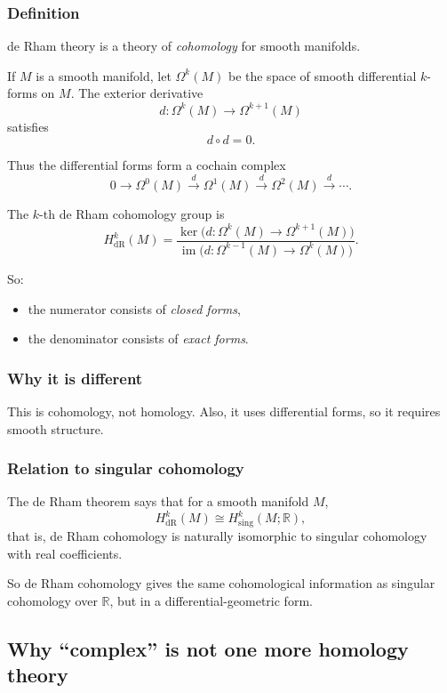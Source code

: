 \documentclass[12pt,a4paper]{article}
\theoremstyle{notespace}
\begin{document}
\subsubsection{Definition}

de Rham theory is a theory of \emph{cohomology} for smooth manifolds.

If \(M\) is a smooth manifold, let \(\Omega^k(M)\) be the space of smooth differential \(k\)-forms on \(M\). The exterior derivative
\[
d:\Omega^k(M)\to \Omega^{k+1}(M)
\]
satisfies
\[
d\circ d=0.
\]

Thus the differential forms form a cochain complex
\[
0\to \Omega^0(M)\xrightarrow{d}\Omega^1(M)\xrightarrow{d}\Omega^2(M)\xrightarrow{d}\cdots.
\]

The \(k\)-th de Rham cohomology group is
\[
H^k_{\mathrm{dR}}(M)
=
\frac{\ker\bigl(d:\Omega^k(M)\to \Omega^{k+1}(M)\bigr)}
{\operatorname{im}\bigl(d:\Omega^{k-1}(M)\to \Omega^k(M)\bigr)}.
\]

So:

\begin{itemize}
	\item the numerator consists of \emph{closed forms},
	\item the denominator consists of \emph{exact forms}.
\end{itemize}

\subsubsection{Why it is different}

This is cohomology, not homology. Also, it uses differential forms, so it requires smooth structure.

\subsubsection{Relation to singular cohomology}

The de Rham theorem says that for a smooth manifold \(M\),
\[
H^k_{\mathrm{dR}}(M)\cong H^k_{\mathrm{sing}}(M;\mathbb R),
\]
that is, de Rham cohomology is naturally isomorphic to singular cohomology with real coefficients.

So de Rham cohomology gives the same cohomological information as singular cohomology over \(\mathbb R\), but in a differential-geometric form.

\subsection{ Why ``complex'' is not one more homology theory}
\end{document}
